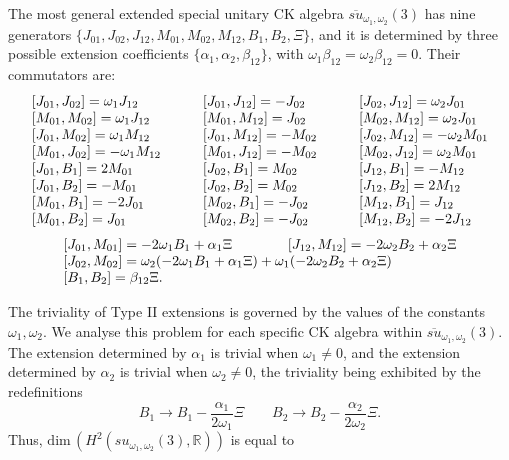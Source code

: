 \documentclass[12pt]{article}
\begin{document}
The most general extended  special unitary CK algebra
$\overline{su}_{{\omega}_1,{\omega}_2}(3)$  has nine generators
$\{{J}_{01},{J}_{02},{J}_{12}, {M}_{01},{M}_{02},{M}_{12},
{B}_{1},{B}_{2},\Xi\}$, and it is determined by three possible extension
coefficients $\{{\alpha}_{1}, {\alpha}_{2}, {\beta}_{12}\}$, with
${\omega}_1{\beta}_{12}={\omega}_2{\beta}_{12}=0$.  Their  commutators are:
\begin{equation}
\begin{array}{lll}
[{J}_{01},{J}_{02}] ={\omega}_{1}{J}_{12} &\qquad
[{J}_{01},{J}_{12}] =-{J}_{02} &\qquad
[{J}_{02},{J}_{12}] ={\omega}_{2}{J}_{01}\cr
[{M}_{01},{M}_{02}] ={\omega}_{1}{J}_{12} &\qquad
[{M}_{01},{M}_{12}] ={J}_{02} &\qquad
[{M}_{02},{M}_{12}] ={\omega}_{2}{J}_{01} \cr
[{J}_{01},{M}_{02}] ={\omega}_{1}{M}_{12} &\qquad
[{J}_{01},{M}_{12}] =-{M}_{02} &\qquad
[{J}_{02},{M}_{12}] =-{\omega}_{2}{M}_{01}\cr
[{M}_{01},{J}_{02}] =-{\omega}_{1}{M}_{12} &\qquad
[{M}_{01},{J}_{12}] =-{M}_{02} &\qquad
[{M}_{02},{J}_{12}] ={\omega}_{2}{M}_{01} \cr
[{J}_{01},{B}_{1}] =2{M}_{01} &\qquad
[{J}_{02},{B}_{1}] = {M}_{02} &\qquad
[{J}_{12},{B}_{1}] =- {M}_{12}\cr
[{J}_{01},{B}_{2}] =-{M}_{01} &\qquad
[{J}_{02},{B}_{2}] = {M}_{02} &\qquad
[{J}_{12},{B}_{2}] =2{M}_{12}\cr
[{M}_{01},{B}_{1}] =-2{J}_{01} &\qquad
[{M}_{02},{B}_{1}] = -{J}_{02} &\qquad
[{M}_{12},{B}_{1}] ={J}_{12}\cr
[{M}_{01},{B}_{2}] ={J}_{01} &\qquad
[{M}_{02},{B}_{2}] = -{J}_{02} &\qquad
[{M}_{12},{B}_{2}] =-2{J}_{12}
\end{array}
\label{qa}
\end{equation}
\begin{equation}
\begin{array}{l}
[{J}_{01},{M}_{01}] =-2{\omega}_1{B}_1+{\alpha}_{1}\Xi
\qquad \qquad  [{J}_{12},{M}_{12}] =-2{\omega}_2{B}_2 +   {\alpha}_{2}\Xi \cr
 [{J}_{02},{M}_{02}] ={\omega}_2(-2{\omega}_1 {B}_1
+{\alpha}_{1}\Xi)+{\omega}_1(  -2{\omega}_2 {B}_2 +   {\alpha}_{2}\Xi   )\cr
[{B}_1,{B}_2]={\beta}_{12}\Xi .
\end{array}
\label{CKsuiiiCR}
\end{equation}

The triviality of Type II extensions is governed by the values of the
constants ${\omega}_1,{\omega}_2$. We analyse this problem for each specific CK
algebra within $\overline{su}_{{\omega}_1,{\omega}_2}(3)$. The extension
determined by ${\alpha}_{1}$ is trivial when ${\omega}_1 \neq 0$, and the
extension determined by ${\alpha}_{2}$ is trivial when ${\omega}_2 \neq 0$, the
triviality being exhibited by the redefinitions
\begin{equation}
{B}_1 \to {B}_1 - \frac{{\alpha}_{1}}{2{\omega}_1} \Xi  \qquad
{B}_2 \to {B}_2 - \frac{{\alpha}_{2}}{2{\omega}_2} \Xi.
\end{equation}
Thus, ${\mbox{dim}}\, (H^2({su}_{{\omega}_1, {\omega}_2}(3),{{\mathbb R}}))$  is equal to
\end{document}
